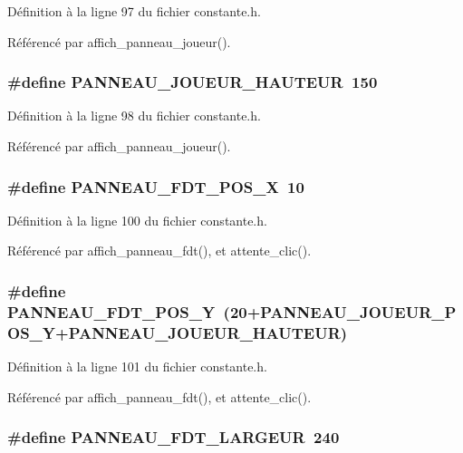 D\'{e}finition \`{a} la ligne 97 du fichier constante.h.

R\'{e}f\'{e}renc\'{e} par affich\_\-panneau\_\-joueur().
\subsubsection{\setlength{\rightskip}{0pt plus 5cm}\#define PANNEAU\_\-JOUEUR\_\-HAUTEUR~150}\label{constante_8h_49ee5a460c09e9ab6c8c2670d3fc0074}




D\'{e}finition \`{a} la ligne 98 du fichier constante.h.

R\'{e}f\'{e}renc\'{e} par affich\_\-panneau\_\-joueur().
\subsubsection{\setlength{\rightskip}{0pt plus 5cm}\#define PANNEAU\_\-FDT\_\-POS\_\-X~10}\label{constante_8h_9c0f34233ee3a1bd135c4e7a78519f58}




D\'{e}finition \`{a} la ligne 100 du fichier constante.h.

R\'{e}f\'{e}renc\'{e} par affich\_\-panneau\_\-fdt(), et attente\_\-clic().
\subsubsection{\setlength{\rightskip}{0pt plus 5cm}\#define PANNEAU\_\-FDT\_\-POS\_\-Y~(20+PANNEAU\_\-JOUEUR\_\-POS\_\-Y+PANNEAU\_\-JOUEUR\_\-HAUTEUR)}\label{constante_8h_906549d5df7f6c71adb6692079bdf3b3}




D\'{e}finition \`{a} la ligne 101 du fichier constante.h.

R\'{e}f\'{e}renc\'{e} par affich\_\-panneau\_\-fdt(), et attente\_\-clic().
\subsubsection{\setlength{\rightskip}{0pt plus 5cm}\#define PANNEAU\_\-FDT\_\-LARGEUR~240}\label{constante_8h_f2f4372048e4737359eefe935df32c8d}




